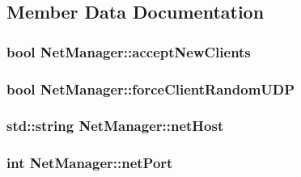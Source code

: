 \subsection{Member Data Documentation}
\hypertarget{classNetManager_a67d25cdb043a462709f1d29e071a5ce8}{
\subsubsection[{accept\-New\-Clients}]{\setlength{\rightskip}{0pt plus 5cm}bool Net\-Manager\-::accept\-New\-Clients\hspace{0.3cm}{\ttfamily [private]}}}\label{classNetManager_a67d25cdb043a462709f1d29e071a5ce8}
\hypertarget{classNetManager_a2e5fedf3835e7c392ccb8b1a23ade8d4}{
\subsubsection[{force\-Client\-Random\-U\-D\-P}]{\setlength{\rightskip}{0pt plus 5cm}bool Net\-Manager\-::force\-Client\-Random\-U\-D\-P\hspace{0.3cm}{\ttfamily [private]}}}\label{classNetManager_a2e5fedf3835e7c392ccb8b1a23ade8d4}
\hypertarget{classNetManager_a2e1aedc97e5fb2f633faeabd2aa266c3}{
\subsubsection[{net\-Host}]{\setlength{\rightskip}{0pt plus 5cm}std\-::string Net\-Manager\-::net\-Host\hspace{0.3cm}{\ttfamily [private]}}}\label{classNetManager_a2e1aedc97e5fb2f633faeabd2aa266c3}
\hypertarget{classNetManager_a2c14b6cf513287e5fb46a85ddb293201}{
\subsubsection[{net\-Port}]{\setlength{\rightskip}{0pt plus 5cm}int Net\-Manager\-::net\-Port\hspace{0.3cm}{\ttfamily [private]}}}\label{classNetManager_a2c14b6cf513287e5fb46a85ddb293201}
